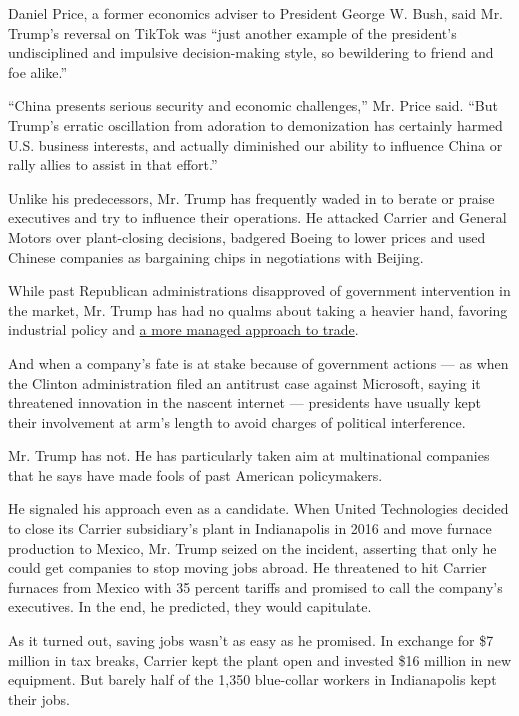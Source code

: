 Daniel Price, a former economics adviser to President George W. Bush,
said Mr. Trump's reversal on TikTok was ``just another example of the
president's undisciplined and impulsive decision-making style, so
bewildering to friend and foe alike.''

``China presents serious security and economic challenges,'' Mr. Price
said. ``But Trump's erratic oscillation from adoration to demonization
has certainly harmed U.S. business interests, and actually diminished
our ability to influence China or rally allies to assist in that
effort.''

Unlike his predecessors, Mr. Trump has frequently waded in to berate or
praise executives and try to influence their operations. He attacked
Carrier and General Motors over plant-closing decisions, badgered Boeing
to lower prices and used Chinese companies as bargaining chips in
negotiations with Beijing.

While past Republican administrations disapproved of government
intervention in the market, Mr. Trump has had no qualms about taking a
heavier hand, favoring industrial policy and
\href{https://www.nytimes.com/2019/12/17/business/trump-trade-deals-free-markets.html}{a
more managed approach to trade}.

And when a company's fate is at stake because of government actions ---
as when the Clinton administration filed an antitrust case against
Microsoft, saying it threatened innovation in the nascent internet ---
presidents have usually kept their involvement at arm's length to avoid
charges of political interference.

Mr. Trump has not. He has particularly taken aim at multinational
companies that he says have made fools of past American policymakers.

He signaled his approach even as a candidate. When United Technologies
decided to close its Carrier subsidiary's plant in Indianapolis in 2016
and move furnace production to Mexico, Mr. Trump seized on the incident,
asserting that only he could get companies to stop moving jobs abroad.
He threatened to hit Carrier furnaces from Mexico with 35 percent
tariffs and promised to call the company's executives. In the end, he
predicted, they would capitulate.

As it turned out, saving jobs wasn't as easy as he promised. In exchange
for \$7 million in tax breaks, Carrier kept the plant open and invested
\$16 million in new equipment. But barely half of the 1,350 blue-collar
workers in Indianapolis kept their jobs.

